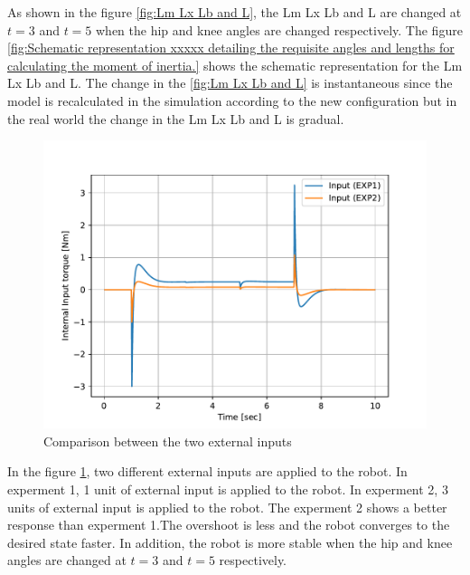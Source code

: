 As shown in the figure \ref{fig:Lm Lx Lb and L}, the Lm Lx Lb and L are changed at $t=3$ and $t=5$ when the hip and knee angles are changed respectively. The figure \ref{fig:Schematic representation xxxxx detailing the requisite angles and lengths for calculating the moment of inertia.} shows the schematic representation for the Lm Lx Lb and L. The change in the \ref{fig:Lm Lx Lb and L} is instantaneous since the model is recalculated in the simulation according to the new configuration but in the real world the change in the Lm Lx Lb and L is gradual.
\vspace{5cm}
\begin{figure}[h]
	\centering
	\includegraphics[width=.5\textwidth]{Comparison between the two external inputs}
	\caption{Comparison between the two external inputs}
	\label{fig:Comparison between the two external inputs}
\end{figure}

In the figure \ref{fig:Comparison between the two external inputs}, two different external inputs are applied to the robot. In experment 1, 1 unit of external input is applied to the robot. In experment 2, 3 units of external input is applied to the robot. The experment 2 shows a better response than experment 1.The overshoot is less and the robot converges to the desired state faster. In addition, the robot is more stable when the hip and knee angles are changed at $t=3$ and $t=5$ respectively.

